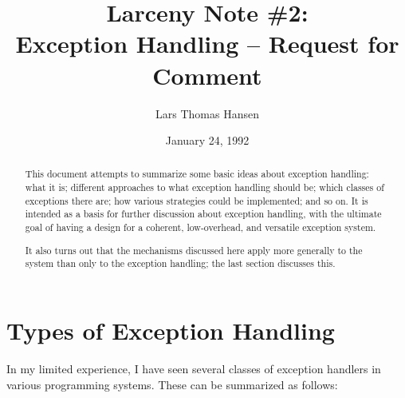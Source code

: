 %



\title{Larceny Note \#2: \\
       Exception Handling -- Request for Comment}
\author{Lars Thomas Hansen}
\date{January 24, 1992}


\maketitle

\begin{abstract}
This document attempts to summarize some basic ideas about exception
handling: what it is; different approaches to what exception handling
should be; which classes of exceptions there are; how various
strategies could be implemented; and so on. It is intended as a basis
for further discussion about exception handling, with the ultimate
goal of having a design for a coherent, low-overhead, and versatile
exception system.

It also turns out that the mechanisms discussed here apply more generally to
the system than only to the exception handling; the last section discusses
this.
\end{abstract}

\section{Types of Exception Handling}

In my limited experience, I have seen several classes of exception handlers
in various programming systems. These can be summarized as follows:

